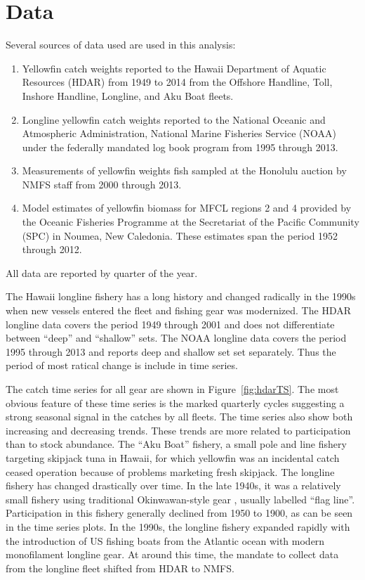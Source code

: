 \documentclass[12pt,letterpaper]{article}
\newcommand\help[1]{\color{Magenta}{\it #1 }\normalcolor}
\begin{document}
\section*{Data}
Several sources of data used are used in this analysis:
\begin{enumerate}
\item  Yellowfin catch weights reported to the Hawaii Department of Aquatic
Resources (HDAR) from 1949 to 2014 from the  Offshore Handline, Toll,
Inshore Handline, Longline, and Aku Boat fleets.
\item Longline yellowfin catch weights reported to the National Oceanic and
Atmospheric Administration, National Marine Fisheries Service (NOAA)
under the federally mandated log book program from 1995 through 2013.
\item Measurements of yellowfin weights fish sampled at the
Honolulu auction by NMFS staff from 2000 through 2013.
\item Model estimates of yellowfin biomass for MFCL regions 2 and 4
provided by the Oceanic Fisheries Programme at the Secretariat of the
Pacific Community (SPC) in Noumea, New Caledonia. These estimates span
the period 1952 through 2012.
\end{enumerate}
All data are reported by quarter of the year.

The Hawaii longline fishery has a long history and changed radically
in the 1990s when new vessels entered the fleet and fishing gear was
modernized.
The HDAR longline data covers the period 1949 through 2001 and does
not differentiate between ``deep'' and ``shallow'' sets.
The NOAA longline data covers the period 1995 through 2013 and reports deep
and shallow set set separately.
Thus the period of most ratical change is include in time series.

The catch time series for all gear are shown in
Figure~\ref{fig:hdarTS}. The most obvious feature of these time
series is the marked quarterly cycles suggesting a strong seasonal
signal in the catches by all fleets.
The time series also show both increasing and decreasing trends. These
trends are more related to participation than to stock abundance.
The ``Aku Boat'' fishery, a small pole and line fishery
targeting skipjack tuna in Hawaii, for which yellowfin was an
incidental catch ceased operation because of
problems marketing fresh skipjack.
The longline fishery has changed drastically over time. In the late
1940s, it was a relatively small fishery using traditional
Okinwawan-style gear \help{(reference)}, usually labelled ``flag
line''. Participation in this fishery generally declined from 1950 to
1900, as can be seen in the time series plots. In the 1990s, the longline
fishery expanded rapidly with the introduction of US fishing boats
from the Atlantic ocean with modern monofilament longline gear. At
around this time, the mandate to collect data from the longline fleet
shifted from HDAR to NMFS.
\help{What happened to the Inshore HL fleet?}
\end{document}
